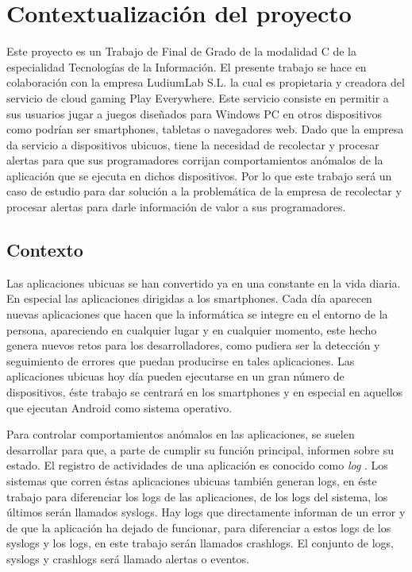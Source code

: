 \chapter{Contextualización del proyecto}

Este proyecto es un Trabajo de Final de Grado de la modalidad C de la especialidad Tecnologías de la Información. El presente trabajo se hace en colaboración con la empresa LudiumLab S.L. la cual es propietaria y creadora del servicio de cloud gaming Play Everywhere. Este servicio consiste en permitir a sus usuarios jugar a juegos diseñados para Windows PC en otros dispositivos como podrían ser smartphones, tabletas o navegadores web. Dado que la empresa da servicio a dispositivos ubicuos, tiene la necesidad de recolectar y procesar alertas para que sus programadores corrijan comportamientos anómalos de la aplicación que se ejecuta en dichos dispositivos. Por lo que este trabajo será un caso de estudio para dar solución a la problemática de la empresa de recolectar y procesar alertas para darle información de valor a sus programadores.

\section{Contexto}
Las aplicaciones ubicuas \cite{Tfg:ubiquitous} se han convertido ya en una constante en la vida diaria. En especial las aplicaciones dirigidas a los smartphones. Cada día aparecen nuevas aplicaciones que hacen que la informática se integre en el entorno de la persona, apareciendo en cualquier lugar y en cualquier momento, este hecho genera nuevos retos para los desarrolladores, como pudiera ser la detección y seguimiento de errores que puedan producirse en tales aplicaciones. Las aplicaciones ubicuas hoy día pueden ejecutarse en un gran número de dispositivos, éste trabajo se centrará en los smartphones y en especial en aquellos que ejecutan Android como sistema operativo.

Para controlar comportamientos anómalos en las aplicaciones, se suelen desarrollar para que, a parte de cumplir su función principal, informen sobre su estado. El registro de actividades de una aplicación es conocido como \textit{log} \cite{Tfg:thelog}. Los sistemas que corren éstas aplicaciones ubicuas también generan logs, en éste trabajo para diferenciar los logs de las aplicaciones, de los logs del sistema, los últimos serán llamados syslogs. Hay logs que directamente informan de un error y de que la aplicación ha dejado de funcionar, para diferenciar a estos logs de los syslogs y los logs, en este trabajo serán llamados crashlogs. El conjunto de logs, syslogs y crashlogs será llamado alertas o eventos.


